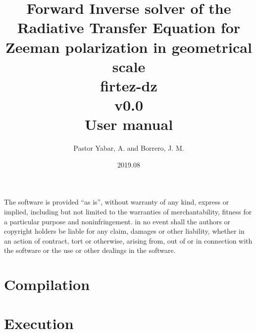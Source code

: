 \documentclass[12pt,a4]{article}
\begin{document}
\title{Forward Inverse solver of the Radiative Transfer Equation for Zeeman polarization in geometrical scale\\firtez-dz\\v0.0\\User manual}
\author{Pastor Yabar, A. and Borrero, J. M.}
\date{2019.08}
\maketitle

\clearpage
\tableofcontents
%
\clearpage
\vspace*{\fill}
\noindent The software is provided ``as is'', without warranty of any kind, express or implied, including but not limited to the warranties of merchantability, fitness for a particular purpose and noninfringement. in no event shall the authors or copyright holders be liable for any claim, damages or other liability, whether in an action of contract, tort or otherwise, arising from, out of or in connection with the software or the use or other dealings in the software.
%
\clearpage
\section{Compilation}

%
\clearpage
\section{Execution}

\end{document}
